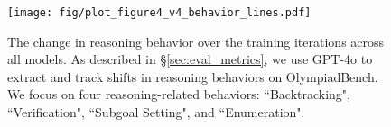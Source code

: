 \documentclass{article} %
\newcommand{\wz}[1]{\textcolor{brown}{\bf\small [#1 --WZ]}}
\newcommand{\yh}[1]{\textcolor{orange}{\bf\small [#1 --YH]}}
\begin{document}



\begin{figure}[!t]
        \centering
\texttt{[image: fig/plot\_figure4\_v4\_behavior\_lines.pdf]}
\caption{The change in reasoning behavior over the training iterations across all models. As described in \S\ref{sec:eval_metrics}, we use GPT-4o to extract and track shifts in reasoning behaviors on OlympiadBench. We focus on four reasoning-related behaviors: ``Backtracking", ``Verification", ``Subgoal Setting", and ``Enumeration".
        }
        \label{fig4:behavior&counts}
\end{figure}






\end{document}
